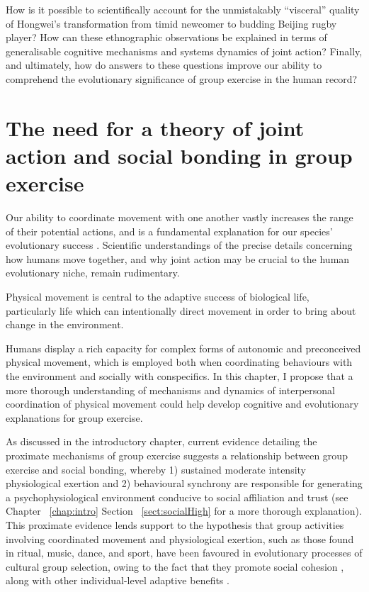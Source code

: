 \begin{CJK}{UTF8}{gbsn}
How is it possible to scientifically account for the unmistakably ``visceral'' quality of Hongwei's transformation from timid newcomer to budding Beijing rugby player?  How can these ethnographic observations be explained in terms of generalisable cognitive mechanisms and systems dynamics of joint action?  Finally, and ultimately, how do answers to these questions improve our ability to comprehend the evolutionary significance of group exercise in the human record?



\section{The need for a theory of joint action and social bonding in group exercise}

Our ability to coordinate movement with one another vastly increases the range of their potential actions, and is a fundamental explanation for our species' evolutionary success \citep{Tomasello2009}. Scientific understandings of the precise details concerning how humans move together, and why joint action may be crucial to the human evolutionary niche, remain rudimentary.


Physical movement is central to the adaptive success of biological life, particularly life which can intentionally direct movement in order to bring about change in the environment.


 Humans display a rich capacity for complex forms of autonomic and preconceived physical movement, which is employed both when coordinating behaviours with the environment and socially with conspecifics.     In this chapter, I propose that a more thorough understanding of mechanisms and dynamics of interpersonal coordination of physical movement could help develop cognitive and evolutionary explanations for group exercise.

As discussed in the introductory chapter, current evidence detailing the proximate mechanisms of group exercise suggests a relationship between group exercise and social bonding, whereby 1) sustained moderate intensity physiological exertion and 2) behavioural synchrony are responsible for generating a psychophysiological environment conducive to social affiliation and trust (see Chapter ~\ref{chap:intro} Section ~\ref{sect:socialHigh} for a more thorough explanation).  This proximate evidence lends support to the hypothesis that group activities involving coordinated movement and physiological exertion, such as those found in ritual, music, dance, and sport, have been favoured in evolutionary processes of cultural group selection, owing to the fact that they promote social cohesion \cite{Dunbar2010}, along with other individual-level adaptive benefits \citep{Cohen2017}.


\end{CJK}
